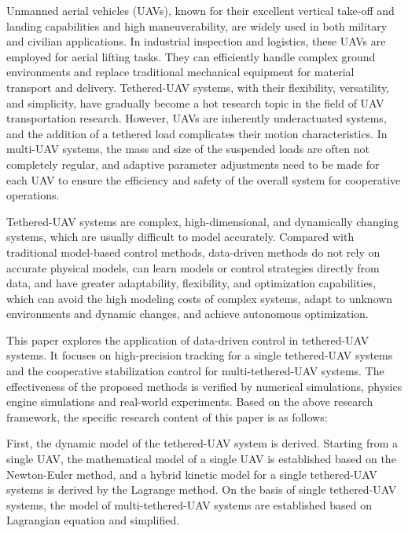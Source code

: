 \documentclass[lang=chs, degree=master, blindreview=false, winfonts=true]{yanputhesis}
\begin{document}
\begin{engabstract}                                         
	Unmanned aerial vehicles (UAVs), known for their excellent vertical take-off and landing capabilities and high maneuverability, are widely used in both military and civilian applications. In industrial inspection and logistics, these UAVs are employed for aerial lifting tasks. They can efficiently handle complex ground environments and replace traditional mechanical equipment for material transport and delivery. Tethered-UAV systems, with their flexibility, versatility, and simplicity, have gradually become a hot research topic in the field of UAV transportation research. However, UAVs are inherently underactuated systems, and the addition of a tethered load complicates their motion characteristics. In multi-UAV systems, the mass and size of the suspended loads are often not completely regular, and adaptive parameter adjustments need to be made for each UAV to ensure the efficiency and safety of the overall system for cooperative operations.
		
	Tethered-UAV systems are complex, high-dimensional, and dynamically changing systems, which are usually difficult to model accurately. Compared with traditional model-based control methods, data-driven methods do not rely on accurate physical models, can learn models or control strategies directly from data, and have greater adaptability, flexibility, and optimization capabilities, which can avoid the high modeling costs of complex systems, adapt to unknown environments and dynamic changes, and achieve autonomous optimization.
	
	This paper explores the application of data-driven control in tethered-UAV systems. It focuses on high-precision tracking for a single tethered-UAV systems and the cooperative stabilization control for multi-tethered-UAV systems. The effectiveness of the proposed methods is verified by numerical simulations, physics engine simulations and real-world experiments. Based on the above research framework, the specific research content of this paper is as follows:
	
	First, the dynamic model of the tethered-UAV system is derived. Starting from a single UAV, the mathematical model of a single UAV is established based on the Newton-Euler method, and a hybrid kinetic model for a single tethered-UAV systems is derived by the Lagrange method. On the basis of single tethered-UAV systems, the model of multi-tethered-UAV systems are established based on Lagrangian equation and simplified.
	

\end{engabstract}
\end{document}
